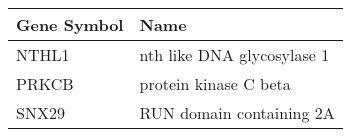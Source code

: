 \begin{tabular}{ll}
\toprule
Gene Symbol &                       Name \\
\midrule
      NTHL1 & nth like DNA glycosylase 1 \\
      PRKCB &      protein kinase C beta \\
      SNX29 &   RUN domain containing 2A \\
\bottomrule
\end{tabular}
